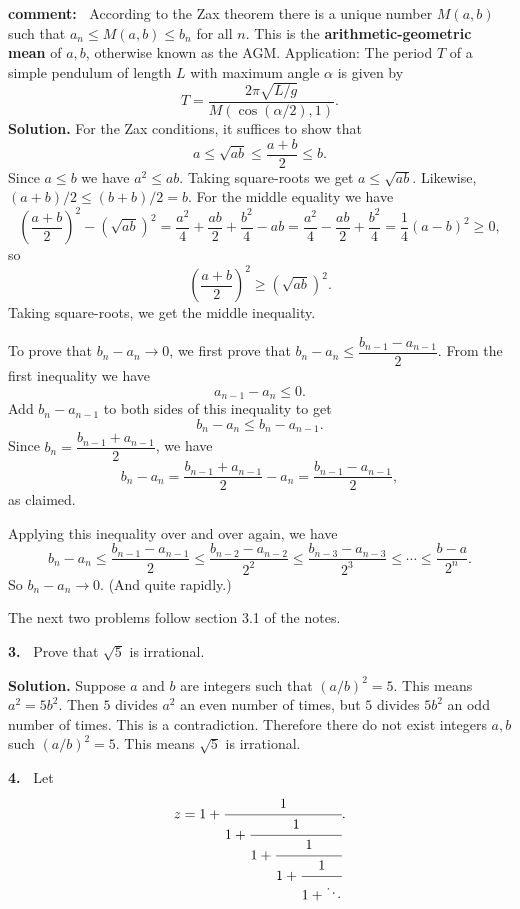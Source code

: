 \documentclass[12pt]{article}
\newcommand{\al}{\alpha}
\theoremstyle{definition}
\theoremstyle{remark}
\theoremstyle{definition}
\newenvironment{Solution}{\noindent\textbf{Solution.}}{}
\begin{document}
{\bf comment:\ } According to the Zax theorem there is a unique number $M(a,b)$ such that $a_n\leq M(a,b)\leq b_n$ for all $n$. This is the {\bf arithmetic-geometric mean} of $a,b$, otherwise known as the AGM. Application: The period $T$ of a simple pendulum of length $L$  with maximum angle $\al$ is given by 
\[T=\frac{2\pi\sqrt{L/g}}{M(\cos(\al/2),1)}.
\]
\begin{Solution}
For the Zax conditions, it suffices to show that 
\[a\leq \sqrt{ab}\leq \frac{a+b}{2}\leq b.\]
Since $a\leq b$ we have $a^2\leq ab$. Taking square-roots  we get $a\leq \sqrt{ab}$. Likewise, $(a+b)/2\leq (b+b)/2=b$. For the middle equality we have 
\[\left(\frac{a+b}{2}\right)^2-\left(\sqrt{ab}\right)^2=\frac{a^2}{4}+\frac{ab}{2}+\frac{b^2}{4}-ab=\frac{a^2}{4}-\frac{ab}{2}+\frac{b^2}{4}=\frac{1}{4}(a-b)^2\geq 0, 
\]
so 
\[\left(\frac{a+b}{2}\right)^2\geq \left(\sqrt{ab}\right)^2.\]
Taking square-roots, we get the middle inequality. 

To prove that $b_n-a_n\to 0$, we first prove that $b_{n}-a_{n}\leq \dfrac{b_{n-1}-a_{n-1}}{2}.$
From the first inequality we have 
\[a_{n-1}- a_{n}\leq 0.\]
Add $b_{n}-a_{n-1}$ to both sides of this inequality to get 
\[b_{n}-a_{n}\leq b_{n}-a_{n-1}.\]
Since  $b_{n}=\dfrac{b_{n-1}+a_{n-1}}{2}$, we have 
\[b_{n}-a_n=\frac{b_{n-1}+a_{n-1}}{2}-a_n=\frac{b_{n-1}-a_{n-1}}{2},\]
as claimed. 

Applying this inequality over and over again, we have
\[b_{n}-a_{n}\leq \dfrac{b_{n-1}-a_{n-1}}{2}\leq \dfrac{b_{n-2}-a_{n-2}}{2^2}
\leq \dfrac{b_{n-3}-a_{n-3}}{2^3}\leq \cdots\leq  \dfrac{b-a}{2^n}.
\]
So $b_n-a_n\to 0$. (And quite rapidly.) 

\end{Solution}

The next two problems follow section 3.1 of the notes. 

{\bf 3.\ } Prove that $\sqrt{5}$ is irrational.

\begin{Solution} Suppose $a$ and $b$ are integers such that $(a/b)^2=5$. 
This means $a^2=5b^2$. Then $5$ divides $a^2$ an even number of times, but $5$ divides $5b^2$ an odd number of times. This is a contradiction. Therefore there do not exist integers $a,b$ such $(a/b)^2=5$. This means $\sqrt{5}$ is irrational. 
 \end{Solution}

\vskip10pt

{\bf 4.\ } Let
\[z=
1+\cfrac {1}{1+ \cfrac{ 1}{1+ \cfrac{ 1}{1+ \cfrac{ 1}{1+ \ddots}}}} .
\]
\end{document}
